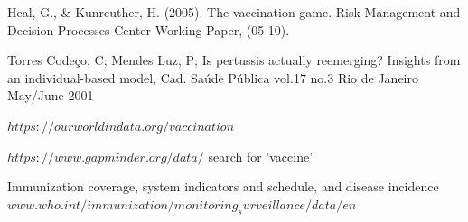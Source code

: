 \documentclass[11pt]{article}
\begin{document}
Heal, G., \& Kunreuther, H. (2005). The vaccination game. Risk Management and Decision Processes Center Working Paper, (05-10). 
\vspace{14px}

Torres Codeço, C; Mendes Luz, P; Is pertussis actually reemerging? Insights from an individual-based model, Cad. Saúde Pública vol.17 no.3 Rio de Janeiro May/June 2001
\vspace{14px}

$https://ourworldindata.org/vaccination$ 
\vspace{14px}

$https://www.gapminder.org/data/$ search for 'vaccine'
\vspace{14px}

Immunization coverage, system indicators and schedule, and disease incidence $www.who.int/immunization/monitoring_surveillance/data/en$


\newpage
\end{document}
